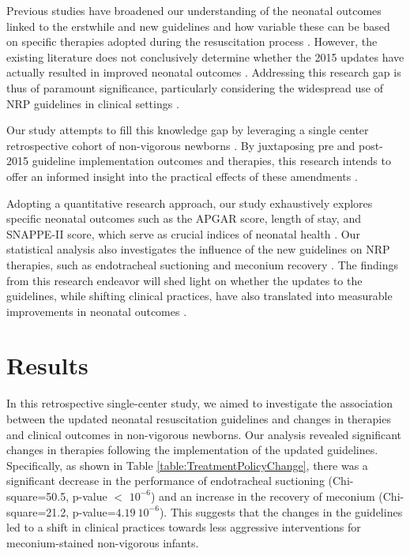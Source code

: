 \documentclass[11pt]{article}
\begin{document}
Previous studies have broadened our understanding of the neonatal outcomes linked to the erstwhile and new guidelines and how variable these can be based on specific therapies adopted during the resuscitation process \cite{Daga1994TrachealSI, Gulczyska2015PRACTICALAO}. However, the existing literature does not conclusively determine whether the 2015 updates have actually resulted in improved neonatal outcomes \cite{Al-shehri2019TheUO, Johnson2020HeartRA}. Addressing this research gap is thus of paramount significance, particularly considering the widespread use of NRP guidelines in clinical settings \cite{Goeral2014PO0394IA, Study2018EpidemiologyCS}.

Our study attempts to fill this knowledge gap by leveraging a single center retrospective cohort of non-vigorous newborns \cite{Mileder2021TelesimulationAA, Lindhard2021SimulationBasedNR}. By juxtaposing pre and post-2015 guideline implementation outcomes and therapies, this research intends to offer an informed insight into the practical effects of these amendments \cite{Rahman2019IdentificationON, Barra2013AnAO}.

Adopting a quantitative research approach, our study exhaustively explores specific neonatal outcomes such as the APGAR score, length of stay, and SNAPPE-II score, which serve as crucial indices of neonatal health \cite{Chawla2020PerinatalNeonatalMO}.  Our statistical analysis also investigates the influence of the new guidelines on NRP therapies, such as endotracheal suctioning and meconium recovery \cite{Gidaganti2018EffectOG, Trevisanuto2020NeonatalRW}. The findings from this research endeavor will shed light on whether the updates to the guidelines, while shifting clinical practices, have also translated into measurable improvements in neonatal outcomes \cite{Jaye1997ClinicalAO, Flannery2021AssessmentOM}.

\section*{Results}

In this retrospective single-center study, we aimed to investigate the association between the updated neonatal resuscitation guidelines and changes in therapies and clinical outcomes in non-vigorous newborns. Our analysis revealed significant changes in therapies following the implementation of the updated guidelines. Specifically, as shown in Table {}\ref{table:TreatmentPolicyChange}, there was a significant decrease in the performance of endotracheal suctioning (Chi-square=50.5, p-value $<$ $10^{-6}$) and an increase in the recovery of meconium (Chi-square=21.2, p-value=$4.19\ 10^{-6}$). This suggests that the changes in the guidelines led to a shift in clinical practices towards less aggressive interventions for meconium-stained non-vigorous infants.
\end{document}
